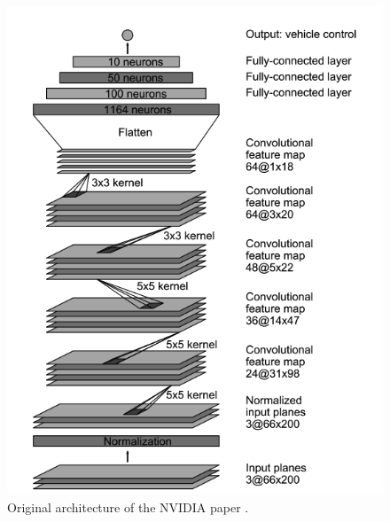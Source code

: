 \begin{frame}[plain]
\begin{figure}
\centering
\includegraphics[scale=0.3]{./imgs/NetworkOriginal.png}
\caption{Original architecture of the NVIDIA paper \cite{NVIDIA2016}.}
\end{figure}
\end{frame}